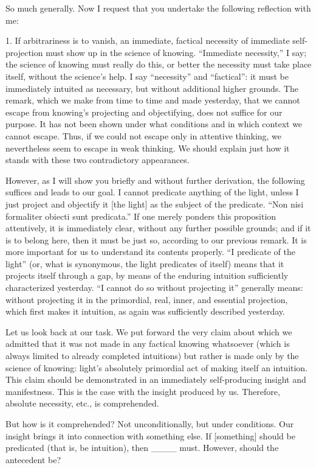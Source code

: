 So much generally.
Now I request that you undertake
the following reflection with me:

1. If arbitrariness is to vanish,
an immediate, factical necessity of
immediate self-projection must show up
in the science of knowing.
“Immediate necessity,” I say;
the science of knowing must really do this,
or better the necessity must take place itself,
without the science's help.
I say “necessity” and “factical”:
it must be immediately intuited as necessary,
but without additional higher grounds.
The remark, which we make from time to time and made yesterday,
that we cannot escape from knowing's
projecting and objectifying,
does not suffice for our purpose.
It has not been shown under what conditions and
in which context we cannot escape.
Thus, if we could not escape only in attentive thinking,
we nevertheless seem to escape in weak thinking.
We should explain just how it stands
with these two contradictory appearances.

However, as I will show you briefly
and without further derivation,
the following suffices and leads to our goal.
I cannot predicate anything of the light,
unless I just project and objectify it
[the light] as the subject of the predicate.
“Non nisi formaliter obiecti sunt predicata.”
If one merely ponders this proposition attentively,
it is immediately clear, without any further possible grounds;
and if it is to belong here, then it must be just so,
according to our previous remark.
It is more important for us to understand its contents properly.
“I predicate of the light”
(or, what is synonymous, the light predicates of itself)
means that it projects itself through a gap,
by means of the enduring intuition
sufficiently characterized yesterday.
“I cannot do so without projecting it” generally means:
without projecting it in
the primordial, real, inner, and essential projection,
which first makes it intuition,
as again was sufficiently described yesterday.

Let us look back at our task.
We put forward the very claim about which
we admitted that it was not made in any factical knowing whatsoever
(which is always limited to already completed intuitions)
but rather is made only by the science of knowing:
light's absolutely primordial act of
making itself an intuition.
This claim should be demonstrated
in an immediately self-producing insight and manifestness.
This is the case with the insight produced by us.
Therefore, absolute necessity, etc., is comprehended.

But how is it comprehended?
Not unconditionally, but under conditions.
Our insight brings it into connection with something else.
If [something] should be predicated
(that is, be intuition), then ____ must.
However, should the antecedent be?


